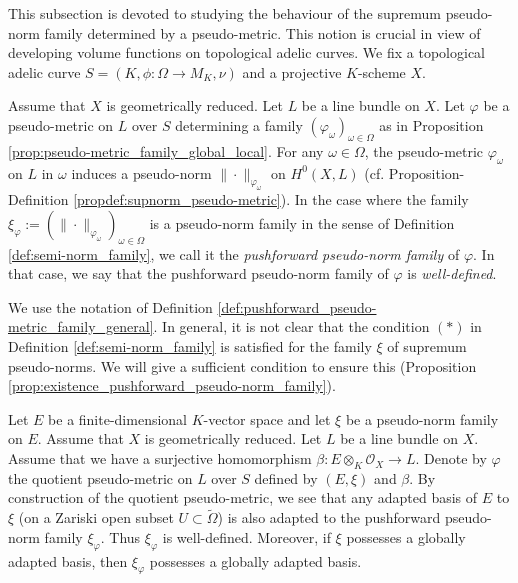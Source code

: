 \documentclass [11pt,reqno]{amsart}
\newcommand{\1}{\mathmybb{1}}
\def\cO{{\mathcal{O}}}
\def\tilde{\widetilde}
\begin{document}
This subsection is devoted to studying the behaviour of the supremum pseudo-norm family determined by a pseudo-metric. This notion is crucial in view of developing volume functions on topological adelic curves. We fix a topological adelic curve $S=(K,\phi:\Omega\to M_K,\nu)$ and a projective $K$-scheme $X$. %

\begin{definition}
\label{def:pushforward_pseudo-metric_family_general}
Assume that $X$ is geometrically reduced. Let $L$ be a line bundle on $X$. Let $\varphi$ be a pseudo-metric on $L$ over $S$ determining a family $(\varphi_{\omega})_{\omega\in\Omega}$ as in Proposition \ref{prop:pseudo-metric_family_global_local}. For any $\omega\in \Omega$, the pseudo-metric $\varphi_{\omega}$ on $L$ in $\omega$ induces a pseudo-norm $\|\cdot\|_{\varphi_{\omega}}$ on $H^{0}(X,L)$ (cf. Proposition-Definition \ref{propdef:supnorm_pseudo-metric}). In the case where the family $\xi_{\varphi}:=(\|\cdot\|_{\varphi_{\omega}})_{\omega\in\Omega}$ is a pseudo-norm family in the sense of Definition \ref{def:semi-norm_family}, we call it the \emph{pushforward pseudo-norm family} of $\varphi$. In that case, we say that the pushforward pseudo-norm family of $\varphi$ is \emph{well-defined}.
\end{definition}

\begin{remark}
We use the notation of Definition \ref{def:pushforward_pseudo-metric_family_general}. In general, it is not clear that the condition $(\ast)$ in Definition \ref{def:semi-norm_family} is satisfied for the family $\xi$ of supremum pseudo-norms. We will give a sufficient condition to ensure this (Proposition \ref{prop:existence_pushforward_pseudo-norm_family}). 
\end{remark}

\begin{example}
\label{example:pushforward_pseudo-metric_family}
Let $E$ be a finite-dimensional $K$-vector space and let $\xi$ be a pseudo-norm family on $E$. Assume that $X$ is geometrically reduced. Let $L$ be a line bundle on $X$. Assume that we have a surjective homomorphism $\beta:E\otimes_{K}\cO_{X}\to L$. Denote by $\varphi$ the quotient pseudo-metric on $L$ over $S$ defined by $(E,\xi)$ and $\beta$. By construction of the quotient pseudo-metric, we see that any adapted basis of $E$ to $\xi$ (on a Zariski open subset $U\subset \tilde{\Omega}$) is also adapted to the pushforward pseudo-norm family $\xi_{\varphi}$. Thus $\xi_{\varphi}$ is well-defined. Moreover, if $\xi$ possesses a globally adapted basis, then $\xi_{\varphi}$ possesses a globally adapted basis. 
\end{example}
\end{document}
